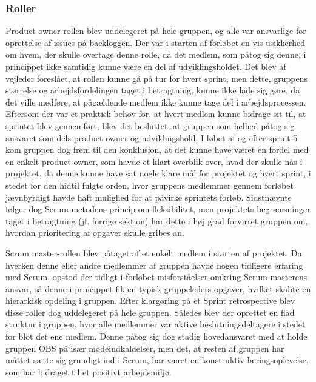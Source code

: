 \subsubsection{Roller}
Product owner-rollen blev uddelegeret på hele gruppen, og alle var ansvarlige for oprettelse af issues på backloggen. Der var i starten af forløbet en vis usikkerhed om hvem, der skulle overtage denne rolle, da det medlem, som påtog sig denne, i princippet ikke samtidig kunne være en del af udviklingsholdet. Det blev af vejleder foreslået, at rollen kunne gå på tur for hvert sprint, men dette, gruppens størrelse og arbejdsfordelingen taget i betragtning, kunne ikke lade sig gøre, da det ville medføre, at pågældende medlem ikke kunne tage del i arbejdsprocessen. Eftersom der var et praktisk behov for, at hvert medlem
kunne bidrage sit til, at sprintet blev gennemført, blev det besluttet, at gruppen som helhed påtog sig ansvaret som dels product owner og udviklingshold. I løbet af og efter sprint 5 kom gruppen dog frem til den konklusion, at det kunne have været en fordel med en enkelt product owner, som havde et klart overblik over, hvad der skulle nås i projektet, da denne kunne have sat nogle klare mål for projektet og hvert sprint, i stedet for den hidtil fulgte orden, hvor gruppens medlemmer gennem forløbet jævnbyrdigt havde haft mulighed for at påvirke sprintets forløb. Sidstnævnte følger dog Scrum-metodens princip om fleksibilitet, men
projektets begrænsninger taget i betragtning (jf. forrige sektion) har dette i høj grad forvirret gruppen om, hvordan prioritering af opgaver skulle gribes an.

Scrum master-rollen blev påtaget af et enkelt medlem i starten af projektet. Da hverken denne eller andre medlemmer af gruppen havde nogen tidligere erfaring med Scrum, opstod der tidligt i forløbet misforståelser omkring Scrum masterens ansvar, så denne i princippet fik en typisk gruppeleders opgaver, hvilket skabte en hierarkisk opdeling i gruppen. Efter klargøring på et Sprint retrospective blev disse roller dog uddelegeret på hele gruppen. Således blev der oprettet en flad struktur i gruppen, hvor alle medlemmer var aktive beslutningsdeltagere i stedet for blot det ene medlem. Denne påtog sig dog stadig hovedansvaret med at holde gruppen
OBS på især mødeindkaldelser, men det, at resten af gruppen har måttet sætte sig grundigt ind i Scrum, har været en konstruktiv læringsoplevelse, som har bidraget til et positivt arbejdsmiljø.


